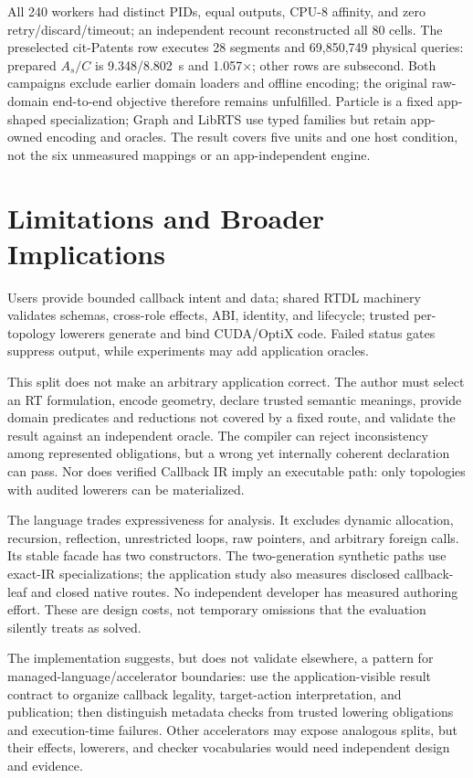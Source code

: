 \documentclass[sigplan,screen,review,anonymous]{acmart}
\newcommand{\rtdl}{\textsc{RTDL}\xspace}
\begin{document}
All 240 workers had distinct PIDs, equal outputs, CPU-8 affinity, and zero
retry/discard/timeout; an independent recount reconstructed all 80 cells. The
preselected cit-Patents row executes 28 segments and 69,850,749 physical
queries: prepared $A_s/C$ is 9.348/8.802~s and 1.057$\times$; other rows are
subsecond. Both campaigns exclude earlier domain loaders and offline encoding;
the original raw-domain end-to-end objective therefore remains unfulfilled.
Particle is a fixed app-shaped
specialization; Graph and LibRTS use typed families but retain app-owned
encoding and oracles. The result covers five units and one host condition, not
the six unmeasured mappings or an app-independent engine.

\section{Limitations and Broader Implications}

Users provide bounded callback intent and data; shared \rtdl machinery validates
schemas, cross-role effects, ABI, identity, and lifecycle; trusted per-topology
lowerers generate and bind CUDA/OptiX code. Failed status gates suppress output,
while experiments may add application oracles.

This split does not make an arbitrary application correct. The author must
select an RT formulation, encode geometry, declare trusted semantic meanings,
provide domain predicates and reductions not covered by a fixed route, and
validate the result against an independent oracle. The compiler can reject
inconsistency among represented obligations, but a wrong yet internally
coherent declaration can pass. Nor does verified Callback IR imply an
executable path: only topologies with audited lowerers can be materialized.

The language trades expressiveness for analysis. It excludes dynamic
allocation, recursion, reflection, unrestricted loops, raw pointers, and
arbitrary foreign calls. Its stable facade has two constructors. The
two-generation synthetic paths use exact-IR specializations; the application
study also measures disclosed callback-leaf and closed native routes. No
independent developer has measured authoring effort. These are design costs,
not temporary omissions that the evaluation silently treats as solved.

The implementation suggests, but does not validate elsewhere, a pattern for
managed-language/accelerator boundaries: use the application-visible result
contract to organize callback legality, target-action interpretation, and
publication; then distinguish metadata checks from trusted lowering obligations
and execution-time failures. Other accelerators may expose analogous splits,
but their effects, lowerers, and checker vocabularies would need independent
design and evidence.
\end{document}
